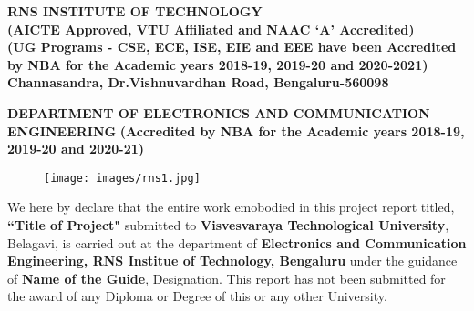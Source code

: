 
\setlength{\toptafiddle}{1in}
\setlength{\bottafiddle}{1in}
\vspace*{-0.5in}
\enlargethispage{\bottafiddle}
\thispagestyle{empty}


\begin{center}
	\large\textbf{RNS INSTITUTE OF TECHNOLOGY}\\
	\small\textbf{(AICTE Approved, VTU Affiliated and NAAC `A' Accredited)\\
		(UG Programs - CSE, ECE, ISE, EIE and EEE have been Accredited by NBA for the Academic years 2018-19, 2019-20 and 2020-2021)\\
		Channasandra, Dr.Vishnuvardhan Road, Bengaluru-560098}\\
		\vspace{0.1cm}
\end{center}
\begin{center}
		\footnotesize\textbf{DEPARTMENT OF ELECTRONICS AND COMMUNICATION ENGINEERING}
		\small\textbf{(Accredited by NBA for the Academic years 2018-19, 2019-20 and 2020-21)}	
\end{center}

\begin{center}
\begin{figure}[h]
\centering
\texttt{[image: images/rns1.jpg]}
\end{figure}
\Large{\textbf{\color{red}{DECLARATION}}}
\end{center}

We here by declare that the entire work emobodied in this project report titled, \textbf{\color{red}``Title of Project"} submitted to \textbf{\color{red}Visvesvaraya Technological University}, Belagavi, is carried out at the department of             \textbf{\color{blue}Electronics and Communication Engineering, RNS Institue of Technology, Bengaluru} under the guidance of \textbf{\color{blue}Name of the Guide}, Designation. This report has not been submitted for the award of any Diploma or Degree of this or any other University.


